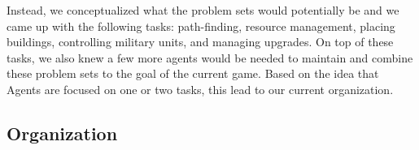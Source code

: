 \documentclass[letterpaper]{article}
\begin{document}
Instead, we conceptualized what the problem sets would potentially be and we came up with the following tasks: path-finding, resource management, placing buildings, controlling military units, and managing upgrades.  On top of these tasks, we also knew a few more agents would be needed to maintain and combine these problem sets to the goal of the current game.  Based on the idea that Agents are focused on one or two tasks, this lead to our current organization.   

\subsection{Organization}
\end{document}
